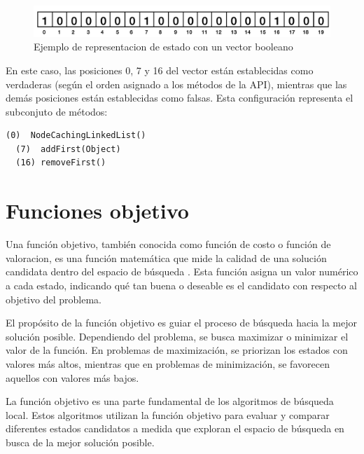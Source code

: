\begin{figure}[H]
  \centering
  \includegraphics[width=1.0\textwidth]{images/cromosoma.png}
  \caption{Ejemplo de representacion de estado con un vector booleano}
  \label{fig:cromosoma}
\end{figure}

En este caso, las posiciones 0, 7 y 16 del vector están establecidas como verdaderas (según el orden asignado a los métodos de la API), mientras que las demás posiciones están establecidas como falsas. Esta configuración representa el subconjuto de métodos:
\vspace{5pt} 

\begin{lstlisting}[numbers=none, caption=Métodos generadores de objetos que representa el cromosoma de la Figura 2, captionpos=b, frame=tb , xleftmargin=0pt, basicstyle=\scriptsize]
  (0)  NodeCachingLinkedList()
  (7)  addFirst(Object)
  (16) removeFirst()
\end{lstlisting}

\section{Funciones objetivo}
\label{sec:fitness}

Una función objetivo, también conocida como función de costo o función de valoracion, es una función matemática que mide la calidad de una solución candidata dentro del espacio de búsqueda \cite{Russell:2009}. Esta función asigna un valor numérico a cada estado, indicando qué tan buena o deseable es el candidato con respecto al objetivo del problema.

El propósito de la función objetivo es guiar el proceso de búsqueda hacia la mejor solución posible. Dependiendo del problema, se busca maximizar o minimizar el valor de la función. En problemas de maximización, se priorizan los estados con valores más altos, mientras que en problemas de minimización, se favorecen aquellos con valores más bajos.

La función objetivo es una parte fundamental de los algoritmos de búsqueda local. Estos algoritmos utilizan la función objetivo para evaluar y comparar diferentes estados candidatos a medida que exploran el espacio de búsqueda en busca de la mejor solución posible.

